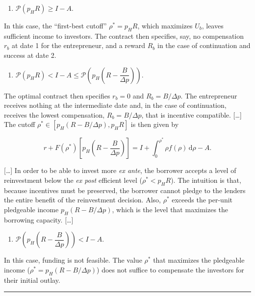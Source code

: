 \documentclass[11pt,a4paper]{article}
\providecommand{\tightlist}{\setlength{\itemsep}{0pt}\setlength{\parskip}{0pt}}
\newcommand{\stmtend}{\par\endgroup\nopagebreak\noindent\rule{\linewidth}{0.4pt}\par\medskip}
\begin{document}
\begin{enumerate}
\def\labelenumi{(\roman{enumi})}
\tightlist
\item
  \(\mathcal{P}(p_HR) \geqslant I - A\).
\end{enumerate}

In this case, the ``first-best cutoff'' \(\rho^* = p_HR\), which maximizes \(U_b\), leaves
sufficient income to investors. The contract then specifies, say, no compensation \(r_b\) at date 1
for the entrepreneur, and a reward \(R_b\) in the case of continuation and success at date 2.

\begin{enumerate}
\def\labelenumi{(\roman{enumi})}
\setcounter{enumi}{1}
\tightlist
\item
  \(\mathcal{P}(p_HR) < I - A \leqslant \mathcal{P}\left(p_H\left(R - \dfrac{B}{\Delta p}\right)\right)\).
\end{enumerate}

The optimal contract then specifies \(r_b = 0\) and \(R_b = B/\Delta p\). The entrepreneur receives
nothing at the intermediate date and, in the case of continuation, receives the lowest compensation,
\(R_b = B/\Delta p\), that is incentive compatible. {[}\ldots{]} The cutoff
\(\rho^* \in [p_H(R - B/\Delta p), p_HR]\) is then given by

\[r + F(\rho^*)\left[p_H\left(R - \frac{B}{\Delta p}\right)\right] = I + \int_0^{\rho^*}\rho f(\rho)\,\mathrm{d}\rho - A.\]

{[}\ldots{]} In order to be able to invest more \emph{ex ante}, the borrower accepts a level of
reinvestment below the \emph{ex post} efficient level (\(\rho^* < p_HR\)). The intuition is that,
because incentives must be preserved, the borrower cannot pledge to the lenders the entire benefit
of the reinvestment decision. Also, \(\rho^*\) exceeds the per-unit pledgeable income
\(p_H(R - B/\Delta p)\), which is the level that maximizes the borrowing capacity. {[}\ldots{]}

\begin{enumerate}
\def\labelenumi{(\roman{enumi})}
\setcounter{enumi}{2}
\tightlist
\item
  \(\mathcal{P}\left(p_H\left(R - \dfrac{B}{\Delta p}\right)\right) < I - A\).
\end{enumerate}

In this case, funding is not feasible. The value \(\rho^*\) that maximizes the pledgeable income
(\(\rho^* = p_H(R - B/\Delta p)\)) does not suffice to compensate the investors for their initial
outlay.
\stmtend
\end{document}
